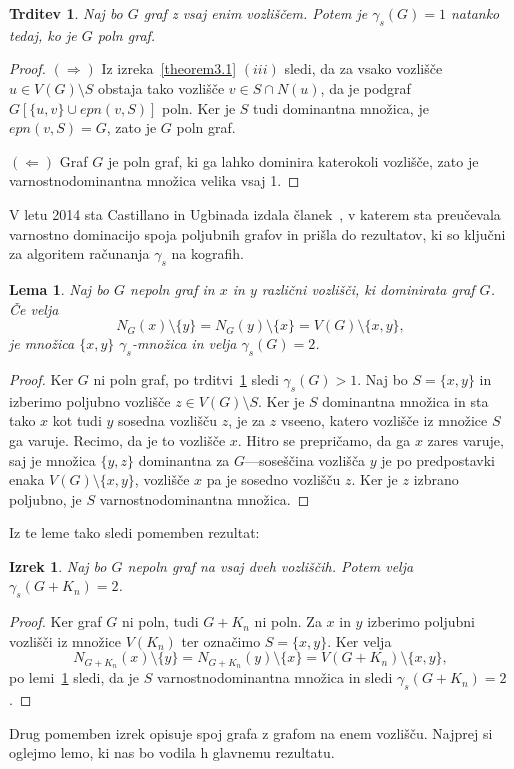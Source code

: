 \documentclass[12pt,a4paper,twoside]{article}
\theoremstyle{definition} %
\theoremstyle{plain} %
\newtheorem{lema}[definicija]{Lema}
\newtheorem{izrek}[definicija]{Izrek}
\newtheorem{trditev}[definicija]{Trditev}
\numberwithin{equation}{section}  %
\begin{document}
\begin{trditev}\label{theorem3.3}
Naj bo $G$ graf z vsaj enim vozliščem. Potem je $\gamma_s(G) = 1$ natanko tedaj, ko je $G$ poln graf.
\end{trditev}
\begin{proof}
$(\Rightarrow)$ Iz izreka~\ref{theorem3.1} $(iii)$ sledi, da za vsako vozlišče $u \in V(G) \setminus S$ obstaja tako vozlišče $v \in S \cap N(u)$, da je podgraf $G[\{u,v\} \cup epn(v,S)]$ poln. Ker je $S$ tudi dominantna množica, je $epn(v, S) = G$, zato je $G$ poln graf.

\medskip
$(\Leftarrow)$ Graf $G$ je poln graf, ki ga lahko dominira katerokoli vozlišče, zato je varnostnodominantna množica velika vsaj 1.
\end{proof}

V letu 2014 sta Castillano in Ugbinada izdala članek~\cite{castillano2014secure}, v katerem sta preučevala varnostno dominacijo spoja poljubnih grafov in prišla do rezultatov, ki so ključni za algoritem računanja $\gamma_s$ na kografih.

\begin{lema}\label{lemaZaGammaS2}{\rm{\cite[Theorem 2.6 $(i)$]{castillano2014secure}}}
Naj bo $G$ nepoln graf in $x$ in $y$ različni vozlišči, ki dominirata graf $G$. Če velja $$N_G(x) \setminus \{y\} = N_G(y) \setminus \{x\} = V(G) \setminus \{x, y\},$$ je množica $\{x, y\}$ $\gamma_s$-množica in velja $\gamma_s(G) = 2$.
\end{lema}
\begin{proof}
Ker $G$ ni poln graf, po trditvi~\ref{theorem3.3} sledi $\gamma_s(G) > 1$. Naj bo $S = \{x, y\}$ in izberimo poljubno vozlišče $z \in V(G) \setminus S$. Ker je $S$ dominantna množica in sta tako $x$ kot tudi $y$ sosedna vozlišču $z$, je za $z$ vseeno, katero vozlišče iz množice $S$ ga varuje. Recimo, da je to vozlišče $x$. Hitro se prepričamo, da ga $x$ zares varuje, saj je množica $\{y, z\}$ dominantna za $G$---soseščina vozlišča $y$ je po predpostavki enaka $V(G) \setminus \{x, y\}$, vozlišče $x$ pa je sosedno vozlišču $z$. Ker je $z$ izbrano poljubno, je $S$ varnostnodominantna množica.
\end{proof}
Iz te leme tako sledi pomemben rezultat:
\begin{izrek}\label{theorem3.4}
Naj bo $G$ nepoln graf na vsaj dveh vozliščih. Potem velja $\gamma_s(G + K_n) = 2$.
\end{izrek}
\begin{proof} Ker graf $G$ ni poln, tudi $G + K_n$ ni poln. Za $x$ in $y$ izberimo poljubni vozlišči iz množice $V(K_n)$ ter označimo $S = \{x, y\}$. Ker velja $$N_{G+K_n}(x) \setminus \{y\} = N_{G+K_n}(y) \setminus \{x\} = V({G+K_n}) \setminus \{x, y\},$$po lemi~\ref{lemaZaGammaS2} sledi, da je $S$ varnostnodominantna množica in sledi $\gamma_s(G + K_n) = 2$. 
\end{proof}
Drug pomemben izrek opisuje spoj grafa z grafom na enem vozlišču. Najprej si oglejmo lemo, ki nas bo vodila h glavnemu rezultatu.
\end{document}
